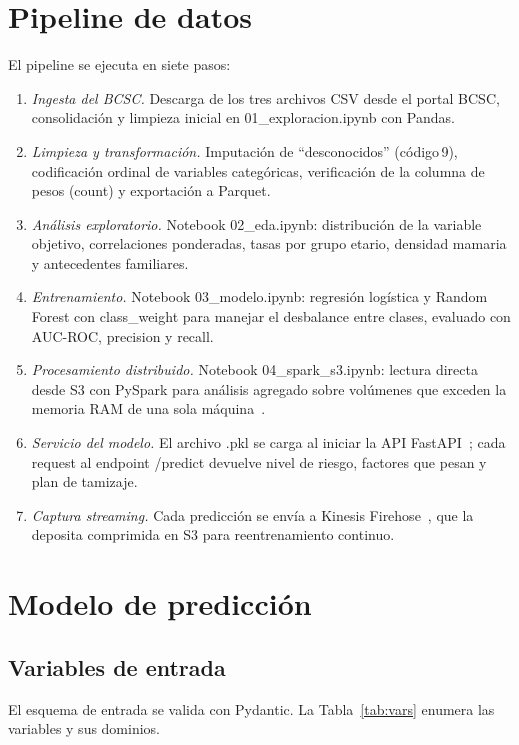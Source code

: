 \documentclass[conference,a4paper,10pt]{IEEEtran}
\newcommand{\code}[1]{{\ttfamily\small\textcolor{hai-primary-dark}{#1}}}
\begin{document}
\section{Pipeline de datos}\label{sec:pipe}
El pipeline se ejecuta en siete pasos:
\begin{enumerate}[leftmargin=*,nosep,label=\arabic*)]
  \item \emph{Ingesta del BCSC.} Descarga de los tres archivos CSV desde el portal BCSC, consolidación y limpieza inicial en \code{01\_exploracion.ipynb} con Pandas.
  \item \emph{Limpieza y transformación.} Imputación de ``desconocidos'' (código\,9), codificación ordinal de variables categóricas, verificación de la columna de pesos (\code{count}) y exportación a Parquet.
  \item \emph{Análisis exploratorio.} Notebook \code{02\_eda.ipynb}: distribución de la variable objetivo, correlaciones ponderadas, tasas por grupo etario, densidad mamaria y antecedentes familiares.
  \item \emph{Entrenamiento.} Notebook \code{03\_modelo.ipynb}: regresión logística y Random Forest con \code{class\_weight} para manejar el desbalance entre clases, evaluado con AUC-ROC, precision y recall.
  \item \emph{Procesamiento distribuido.} Notebook \code{04\_spark\_s3.ipynb}: lectura directa desde S3 con PySpark para análisis agregado sobre volúmenes que exceden la memoria RAM de una sola máquina~\cite{spark}.
  \item \emph{Servicio del modelo.} El archivo \code{.pkl} se carga al iniciar la API FastAPI~\cite{fastapi}; cada request al endpoint \code{/predict} devuelve nivel de riesgo, factores que pesan y plan de tamizaje.
  \item \emph{Captura streaming.} Cada predicción se envía a Kinesis Firehose~\cite{firehose}, que la deposita comprimida en S3 para reentrenamiento continuo.
\end{enumerate}

\section{Modelo de predicción}\label{sec:modelo}

\subsection{Variables de entrada}
El esquema de entrada se valida con Pydantic. La Tabla~\ref{tab:vars}
enumera las variables y sus dominios.
\end{document}
